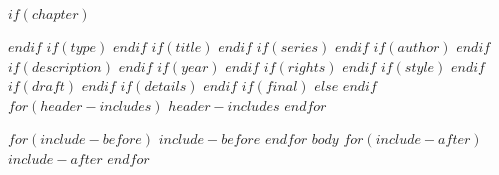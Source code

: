 $if(chapter)$
\setcounter{chapter}{$chapter$}
\addtocounter{chapter}{-1}
$endif$
$if(type)$
\renewcommand{\bookgentype}{$type$}
$endif$
$if(title)$
\renewcommand{\titleinfo}{$title$}
$endif$
$if(series)$
\renewcommand{\seriesinfo}{$series$}
$endif$
$if(author)$
\renewcommand{\authorinfo}{$author$}
$endif$
$if(description)$
\renewcommand{\descriptioninfo}{$description$}
$endif$
$if(year)$
\renewcommand{\yearinfo}{$year$}
$endif$
$if(rights)$
\renewcommand{\rightsinfo}{$rights$}
$endif$
$if(style)$
\renewcommand{\editioninfo}{\capitalisewords{$style$}}
$endif$
$if(draft)$
\renewcommand{\draftinfo}{$draft$}
$endif$
$if(details)$
\renewcommand{\detailsinfo}{$details$}
$endif$
$if(final)$
\DraftOff
$else$
\DraftOn
$endif$
$for(header-includes)$
$header-includes$
$endfor$

$for(include-before)$
$include-before$
$endfor$
$body$
$for(include-after)$
$include-after$
$endfor$
